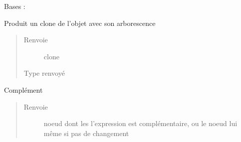 \documentclass[letterpaper,10pt,french]{sphinxmanual}
\begin{document}
\begin{fulllineitems}
\label{\detokenize{logicexpressionnodes:logicexpressionnodes.OrNode}}
Bases : {\hyperref[\detokenize{logicexpressionnodes:logicexpressionnodes.LogicExpressionNode}]{}}

\begin{fulllineitems}
\label{\detokenize{logicexpressionnodes:logicexpressionnodes.OrNode.clone}}
Produit un clone de l’objet avec son arborescence
\begin{quote}\begin{description}
\item[{Renvoie}] \leavevmode
clone

\item[{Type renvoyé}] \leavevmode
{\hyperref[\detokenize{logicexpressionnodes:logicexpressionnodes.LogicExpressionNode}]{}}

\end{description}\end{quote}

\end{fulllineitems}


\begin{fulllineitems}
\label{\detokenize{logicexpressionnodes:logicexpressionnodes.OrNode.logicNegateClone}}
Complément
\begin{quote}\begin{description}
\item[{Renvoie}] \leavevmode
noeud dont les l’expression est complémentaire, ou le noeud lui même si pas de changement


\end{description}
\end{quote}
\end{fulllineitems}
\end{fulllineitems}
\end{document}
